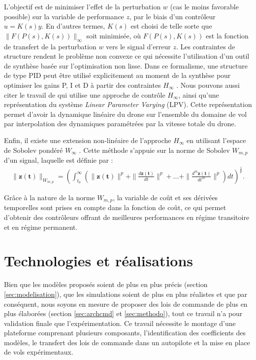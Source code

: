 L'objectif est de minimiser l'effet de la perturbation $w$  (cas le moins favorable possible) sur la variable de performance $z$, par le biais d'un contrôleur $u = K(s) y$. En d'autres termes, $K(s)$ est choisi de telle sorte que $\| F(P(s), K(s))\|_{\infty}$  soit minimisée, où $F(P(s), K(s))$ est la fonction de transfert de la perturbation $w$ vers le signal d'erreur $z$. 
{\color{blue}
    Les contraintes de structure rendent le problème non convexe ce qui nécessite l'utilisation d'un outil de synthèse basée sur l'optimisation non lisse. Dans ce formalisme, une structure de type PID peut être utilisé explicitement au moment de la synthèse pour optimiser les gains P, I et D à partir des contraintes $H_{\infty}$ \cite{1576856,ApkarianMulti}.
}
Nous pouvons aussi citer le travail de \cite{SNYDER2021106621} qui utilise une approche de contrôle $H_{\infty}$, ainsi qu'une représentation du système \textit{Linear Parameter Varying} (LPV). Cette représentation permet d'avoir la dynamique linéaire du drone sur l'ensemble du domaine de vol par interpolation des dynamiques paramétrées par la vitesse totale du drone.

Enfin, il existe une extension non-linéaire de l'approche $H_{\infty}$ en utilisant l'espace de Sobolev pondéré $W_{\infty}$ \cite{cardoso2018nonlinear, CardosoEsteban2019, cardoso2021robust, cardoso2024robust}. Cette méthode s'appuie sur la norme de Sobolev $W_{m,p}$  d'un signal, laquelle est définie par :
\begin{align*}
    \|\boldsymbol{z(t)}\|_{W_{m,p}} = \left( \int_{t_{0}}^{\infty}(\|\boldsymbol{z(t)}\|^{p} + \|\frac{d \boldsymbol{z(t)}}{dt}\|^{p} + ... + \|\frac{d^{m} \boldsymbol{z(t)}}{dt^{m}}\|^{p}) dt \right)^{\frac{1}{p}}.
\end{align*}  

Grâce à la nature de la norme $W_{m,p}$, la variable de coût et ses dérivées temporelles sont prises en compte dans la fonction de coût, ce qui permet d'obtenir des contrôleurs offrant de meilleures performances en régime transitoire et en régime permanent.


\section{Technologies et réalisations}

Bien que les modèles proposés soient de plus en plus précis (section \ref{sec:modelisation}), que les simulations soient de plus en plus réalistes et que par conséquent, nous soyons en mesure de proposer des lois de commande de plus en plus élaborées (section \ref{sec:archcmd} et \ref{sec:methodo}), tout ce travail n'a pour validation finale que l'expérimentation. Ce travail nécessite  le montage d'une plateforme comprenant plusieurs composants, l'identification des coefficients des modèles, le transfert des lois de commande dans un autopilote et la mise en place de vols expérimentaux.


